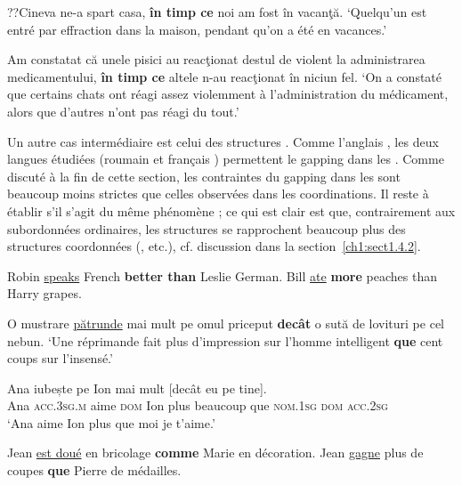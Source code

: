 \ea
\ea ??Cineva ne-a spart casa, \textbf{în timp ce} noi am fost în vacanţă. \label{ch2:ex42a}
\glt  ‘Quelqu’un est entré par effraction dans la maison, pendant qu’on a été en vacances.’

\ex  Am constatat că unele pisici au reacţionat destul de violent la administrarea medicamentului, \textbf{în timp ce} altele n-au reacţionat în niciun fel. \label{ch2:ex42b}
\glt  ‘On a constaté que certains chats ont réagi assez violemment à l’administration du médicament, alors que d’autres n’ont pas réagi du tout.’
\z
\z

Un autre cas intermédiaire est celui des structures . Comme l’an\-glais , les deux langues étudiées (roumain  et français ) permettent le gapping dans les . Comme discuté à la fin de cette section, les contraintes du gapping dans les  sont beaucoup moins strictes que celles observées dans les coordinations. Il reste à établir s’il s’agit du même phénomène ; ce qui est clair est que, contrairement aux subordonnées ordinaires, les structures  se rapprochent beaucoup plus des structures coordonnées (\citealt{Moltmann1992,Osborne2009}, etc.), cf. discussion dans la section~\ref{ch1:sect1.4.2}.


\ea \label{ch2:ex43}
\ea  Robin \uline{speaks} French \textbf{better than} Leslie German. \citep{CulicoverEtAl2005} 
\ex Bill \uline{ate} \textbf{more} peaches than Harry grapes. \citep{Jackendoff1971} 
\z
\z


\ea \label{ch2:ex44}
\ea O mustrare \uline{pătrunde} mai mult pe omul priceput \textbf{decât} o sută de lovituri pe cel nebun.
\glt ‘Une réprimande fait plus d’impression sur l’homme intelligent \textbf{que} cent coups sur l’insensé.’  

\ex  
\gll Ana    iubește  pe  Ion  mai  mult  [decât  eu  pe  tine].\\ 
Ana \textsc{acc.3sg.m} aime \textsc{dom}  Ion  plus  beaucoup  que  \textsc{nom.1sg} \textsc{dom}  \textsc{acc.2sg}\\  
\glt ‘Ana aime Ion plus que moi je t’aime.’
\z
\z


\ea \label{ch2:ex45}
\ea  Jean \uline{est doué} en bricolage \textbf{comme} Marie en décoration. \citep{AmsiliEtAl2008}  
\ex Jean \uline{gagne} plus de coupes \textbf{que} Pierre de médailles.     
\z
\z

